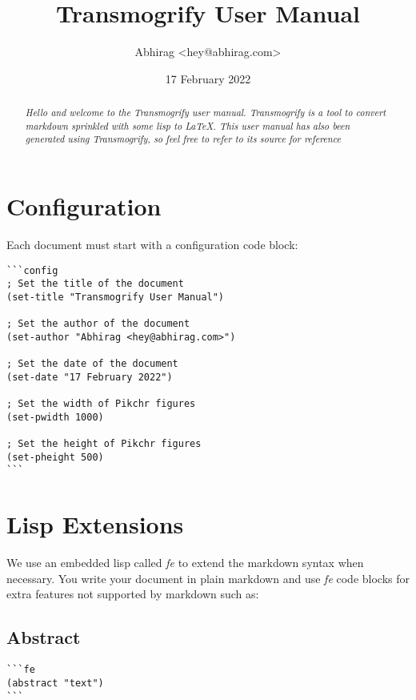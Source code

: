 \documentclass{tufte-handout}
\title{Transmogrify User Manual}
\author{Abhirag <hey@abhirag.com>}
\date{17 February 2022}
\begin{document}
\maketitle
\begin{abstract}
\textit{Hello and welcome to the Transmogrify user manual. 
Transmogrify is a tool to convert markdown sprinkled with some lisp to LaTeX. This user manual 
has also been generated using Transmogrify, so feel free to refer to its source for reference}
\end{abstract}\section{Configuration}\label{sec:1}
Each document must start with a configuration code block:\begin{verbatim}
```config
; Set the title of the document
(set-title "Transmogrify User Manual")

; Set the author of the document 
(set-author "Abhirag <hey@abhirag.com>")

; Set the date of the document
(set-date "17 February 2022")

; Set the width of Pikchr figures 
(set-pwidth 1000)

; Set the height of Pikchr figures 
(set-pheight 500)
```

\end{verbatim}
\section{Lisp Extensions}\label{sec:2}
We use an embedded lisp called \textit{fe} to extend the markdown syntax when necessary.
You write your document in plain markdown and use \textit{fe} code blocks for extra features
not supported by markdown such as:\subsection{Abstract}\begin{verbatim}
```fe
(abstract "text")
```

\end{verbatim}
\end{document}
